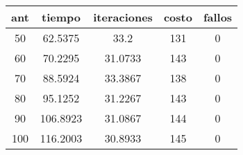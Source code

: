 \begin{table}[h!]
\centering
\begin{tabular}{ccccc}
ant & tiempo & iteraciones & costo & fallos \\ 
\hline 
50 & 62.5375 & 33.2 & 131 & 0 \\ 
60 & 70.2295 & 31.0733 & 143 & 0 \\ 
70 & 88.5924 & 33.3867 & 138 & 0 \\ 
80 & 95.1252 & 31.2267 & 143 & 0 \\ 
90 & 106.8923 & 31.0867 & 144 & 0 \\ 
100 & 116.2003 & 30.8933 & 145 & 0 \\ 
\hline 
\end{tabular}
\end{table}